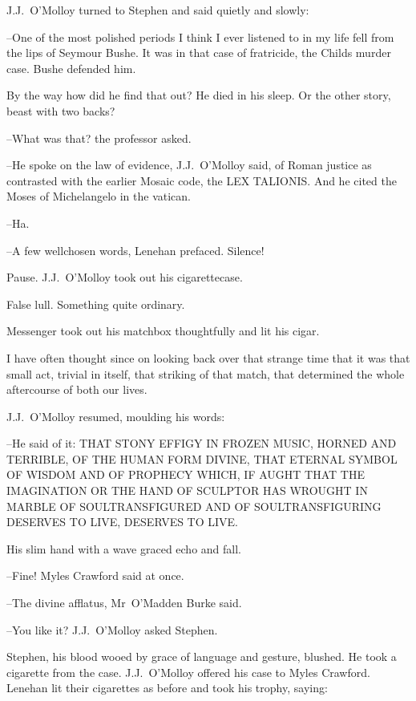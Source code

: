 J.J.~O'Molloy turned to Stephen
and said quietly and slowly:

--One of the most polished periods
I think I ever listened to in my life
fell from the lips of Seymour Bushe.
It was in that case of fratricide,
the Childs murder case.
Bushe defended him.


By the way how did he find that out?
He died in his sleep.
Or the other story,
beast with two backs?

--What was that?
the professor asked.



--He spoke on the law of evidence,
J.J.~O'Molloy said,
of Roman justice
as contrasted with the earlier Mosaic code,
the LEX TALIONIS.
And he cited the Moses of Michelangelo in the vatican.

--Ha.

--A few wellchosen words,
Lenehan prefaced.
Silence!

Pause.
J.J.~O'Molloy took out his cigarettecase.

False lull.
Something quite ordinary.

Messenger took out his matchbox thoughtfully and lit his cigar.

I have often thought since
on looking back over that strange time
that it was that small act,
trivial in itself,
that striking of that match,
that determined the whole aftercourse of both our lives.



J.J.~O'Molloy resumed,
moulding his words:

--He said of it:
THAT STONY EFFIGY IN FROZEN MUSIC,
HORNED AND TERRIBLE,
OF THE HUMAN FORM DIVINE,
THAT ETERNAL SYMBOL OF WISDOM AND OF PROPHECY
WHICH, IF AUGHT THAT THE IMAGINATION
OR THE HAND OF SCULPTOR HAS WROUGHT IN MARBLE
OF SOULTRANSFIGURED AND OF SOULTRANSFIGURING
DESERVES TO LIVE,
DESERVES TO LIVE.

His slim hand with a wave graced echo and fall.

--Fine!
Myles Crawford said at once.

--The divine afflatus,
Mr~O'Madden Burke said.

--You like it?
J.J.~O'Molloy asked Stephen.

Stephen,
his blood wooed by grace of language and gesture,
blushed.
He took a cigarette from the case.
J.J.~O'Molloy offered his case to Myles Crawford.
Lenehan lit their cigarettes as before
and took his trophy,
saying:


